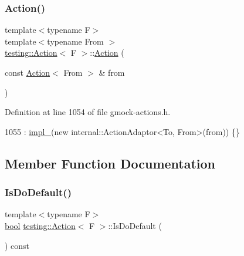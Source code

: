 \mbox{\label{classtesting_1_1Action_af23eef2fff5a92d8ff2ed7ac7a542005}} 
\subsubsection{\texorpdfstring{Action()}{Action()}\hspace{0.1cm}{\footnotesize\ttfamily [5/5]}}
{\footnotesize\ttfamily template$<$typename F$>$ \\
template$<$typename From $>$ \\
\hyperlink{classtesting_1_1Action}{testing\+::\+Action}$<$ F $>$\+::\hyperlink{classtesting_1_1Action}{Action} (\begin{DoxyParamCaption}\item[{const \hyperlink{classtesting_1_1Action}{Action}$<$ From $>$ \&}]{from }\end{DoxyParamCaption})}



Definition at line 1054 of file gmock-\/actions.\+h.


\begin{DoxyCode}
1055     : \hyperlink{classtesting_1_1Action_a878cb86f5126a22b5c6d5d8fb919f5d9}{impl\_}(\textcolor{keyword}{new} internal::ActionAdaptor<To, From>(from)) \{\}
\end{DoxyCode}


\subsection{Member Function Documentation}
\mbox{\label{classtesting_1_1Action_a4468ca2ea5e9f7363271145992d09dba}} 
\subsubsection{\texorpdfstring{Is\+Do\+Default()}{IsDoDefault()}}
{\footnotesize\ttfamily template$<$typename F$>$ \\
\hyperlink{classbool}{bool} \hyperlink{classtesting_1_1Action}{testing\+::\+Action}$<$ F $>$\+::Is\+Do\+Default (\begin{DoxyParamCaption}{ }\end{DoxyParamCaption}) const\hspace{0.3cm}{\ttfamily [inline]}}



